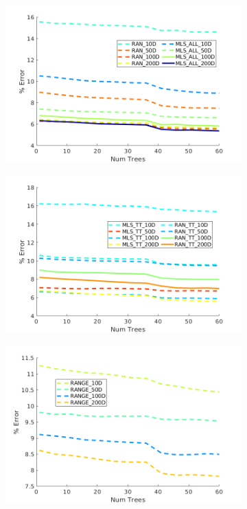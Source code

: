 \documentclass[journal,onecolumn]{IEEEtran}
\begin{document}
	\begin{figure}[H]
		\centering
		\begin{subfigure}{0.45\textwidth}
			\centering
			\includegraphics[width=1\linewidth]{figures/MLS_RAN_ALL}
			\caption[]{}
			\label{fig:all_mls_ransac_comp}
		\end{subfigure}
		\begin{subfigure}{0.45\textwidth}
			\centering
			\includegraphics[width=1\linewidth]{figures/MLS_RAN_TT}
			\caption[]{}
			\label{fig:xyz_mls_ransac_comp}
		\end{subfigure}
		\label{fig:xyz_mls_comp_1}
		\begin{subfigure}{0.45\textwidth}
			\centering
			\includegraphics[width=1\linewidth]{figures/Range_Vali_Error}

\end{subfigure}
\end{figure}
\end{document}
